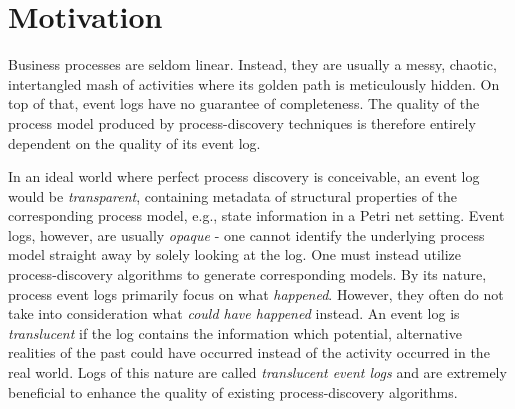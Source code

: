 \section{Motivation}
\label{sec:intro_ssec:motiv}



\begin{comment}
    In this section, you explain to the reader why:

\begin{enumerate}
    \item The problem you are solving is relevant to be solved.
    \item The existing solutions do not solve the problem and/or have significant problems/shortcomings when doing so.
\end{enumerate}
Note that parts of this section are already highlighted in both the abstract and the introduction.
However, in this section, you dive a bit deeper.
In a good motivation, you show a (simple) example on which current methods fail, yet, the method that you are going to describe in this thesis actually yields a better result.

For example, assume that your thesis describes a new \emph{process-discovery} algorithm that is able to handle noise, incomplete behavior, and, on top of that, is able to apply label-splitting.
You can take an (example) event log and show that existing algorithms result in models that are of suboptimal quality.
Finally, you show a model discovered by your fancy algorithm, and, you explain why this model is so much better.
\end{comment}

Business processes are seldom linear. Instead, they are usually a messy, chaotic, intertangled mash of activities where its golden path is meticulously hidden. On top of that, event logs have no guarantee of completeness. The quality of the process model produced by process-discovery techniques is therefore entirely dependent on the quality of its event log.

In an ideal world where perfect process discovery is conceivable, an event log would be \emph{transparent}, containing metadata of structural properties of the corresponding process model, e.g., state information in a Petri net setting. Event logs, however, are usually \emph{opaque} - one cannot identify the underlying process model straight away by solely looking at the log. One must instead utilize process-discovery algorithms to generate corresponding models. By its nature, process event logs primarily focus on what \emph{happened}. However, they often do not take into consideration what \emph{could have happened} instead. An event log is \textit{translucent} if the log contains the information which potential, alternative realities of the past could have occurred instead of the activity occurred in the real world. Logs of this nature are called \textit{translucent event logs} and are extremely beneficial to enhance the quality of existing process-discovery algorithms.

